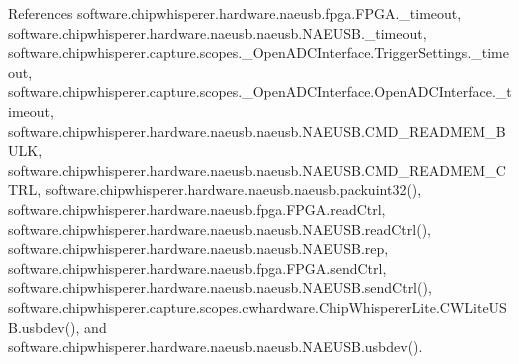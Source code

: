 References software.\+chipwhisperer.\+hardware.\+naeusb.\+fpga.\+F\+P\+G\+A.\+\_\+timeout, software.\+chipwhisperer.\+hardware.\+naeusb.\+naeusb.\+N\+A\+E\+U\+S\+B.\+\_\+timeout, software.\+chipwhisperer.\+capture.\+scopes.\+\_\+\+Open\+A\+D\+C\+Interface.\+Trigger\+Settings.\+\_\+timeout, software.\+chipwhisperer.\+capture.\+scopes.\+\_\+\+Open\+A\+D\+C\+Interface.\+Open\+A\+D\+C\+Interface.\+\_\+timeout, software.\+chipwhisperer.\+hardware.\+naeusb.\+naeusb.\+N\+A\+E\+U\+S\+B.\+C\+M\+D\+\_\+\+R\+E\+A\+D\+M\+E\+M\+\_\+\+B\+U\+L\+K, software.\+chipwhisperer.\+hardware.\+naeusb.\+naeusb.\+N\+A\+E\+U\+S\+B.\+C\+M\+D\+\_\+\+R\+E\+A\+D\+M\+E\+M\+\_\+\+C\+T\+R\+L, software.\+chipwhisperer.\+hardware.\+naeusb.\+naeusb.\+packuint32(), software.\+chipwhisperer.\+hardware.\+naeusb.\+fpga.\+F\+P\+G\+A.\+read\+Ctrl, software.\+chipwhisperer.\+hardware.\+naeusb.\+naeusb.\+N\+A\+E\+U\+S\+B.\+read\+Ctrl(), software.\+chipwhisperer.\+hardware.\+naeusb.\+naeusb.\+N\+A\+E\+U\+S\+B.\+rep, software.\+chipwhisperer.\+hardware.\+naeusb.\+fpga.\+F\+P\+G\+A.\+send\+Ctrl, software.\+chipwhisperer.\+hardware.\+naeusb.\+naeusb.\+N\+A\+E\+U\+S\+B.\+send\+Ctrl(), software.\+chipwhisperer.\+capture.\+scopes.\+cwhardware.\+Chip\+Whisperer\+Lite.\+C\+W\+Lite\+U\+S\+B.\+usbdev(), and software.\+chipwhisperer.\+hardware.\+naeusb.\+naeusb.\+N\+A\+E\+U\+S\+B.\+usbdev().


